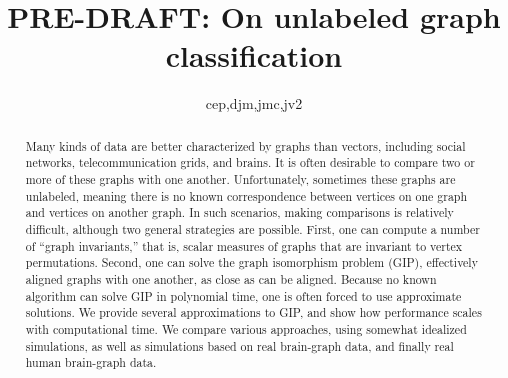  
\usepackage{url}

\newcommand{\mcE}{\mathcal{E}}
\newcommand{\mcT}{\mathcal{T}}
\newcommand{\mcG}{\mathcal{G}}
\newcommand{\mcM}{\mathcal{M}}
\newcommand{\mcL}{\mathcal{L}}
\newcommand{\hatmcE}{\widehat{\mcE}}
\newcommand{\hatp}{\widehat{p}}
\newcommand{\hatP}{\widehat{P}}
\newcommand{\hatQ}{\widehat{Q}}
\newcommand{\hatL}{\widehat{L}}
\newcommand{\mhP}{\widehat{\PP}}
\newcommand{\tildeA}{\widetilde{A}}

\newcommand{\defa}{\begin{defi}}
\newcommand{\defb}{\end{defi}}

\newtheorem{Rem}{Remark}%
\newtheorem{Alg}{Algorithm}%
\newtheorem{Thm}{Theorem}[section]
\newtheorem{Lem}{Lemma}[section]
\newtheorem{Def}{Definition}[section]

\title{PRE-DRAFT: On unlabeled graph classification}

\author{cep,djm,jmc,jv2}



\maketitle
\begin{abstract}
	
Many kinds of data are better characterized by graphs than vectors, including social networks, telecommunication grids, and brains.  It is often desirable to compare two or more of these graphs with one another.  Unfortunately, sometimes these graphs are unlabeled, meaning there is no known correspondence between vertices on one graph and vertices on another graph. In such scenarios, making comparisons is relatively difficult, although two general strategies are possible.  First, one can compute a number of ``graph invariants,'' that is, scalar measures of graphs that are invariant to vertex permutations.  Second, one can solve the graph isomorphism problem (GIP), effectively aligned graphs with one another, as close as can be aligned.  Because no known algorithm can solve GIP in polynomial time, one is often forced to use approximate solutions.  We provide several approximations to GIP, and show how performance scales with computational time.  We compare various approaches, using somewhat idealized simulations, as well as simulations based on real brain-graph data, and finally real human brain-graph data.

\end{abstract}

